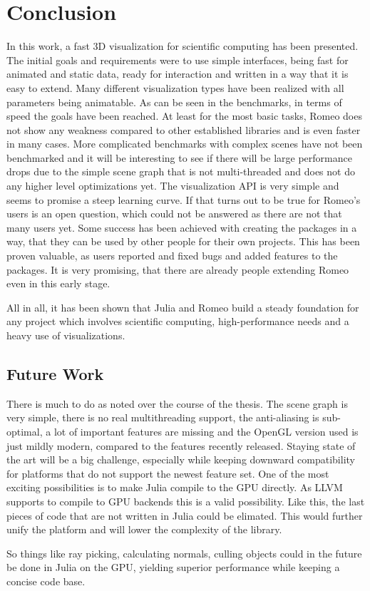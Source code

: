 \section{Conclusion}

In this work, a fast 3D visualization for scientific computing has been presented. 
The initial goals and requirements were to use simple interfaces, being fast for animated and static data, ready for interaction and written in a way that it is easy to extend.
Many different visualization types have been realized with all parameters being animatable.
As can be seen in the benchmarks, in terms of speed the goals have been reached. 
At least for the most basic tasks, Romeo does not show any weakness compared to other established libraries and is even faster in many cases.
More complicated benchmarks with complex scenes have not been benchmarked and it will be interesting to see if there will be large performance drops due to the simple scene graph that is not multi-threaded and does not do any higher level optimizations yet.
The visualization API is very simple and seems to promise a steep learning curve.
If that turns out to be true for Romeo's users is an open question, which could not be answered as there are not that many users yet.
Some success has been achieved with creating the packages in a way, that they can be used by other people for their own projects. This has been proven valuable, as users reported and fixed bugs and added features to the packages.
It is very promising, that there are already people extending Romeo even in this early stage.

All in all, it has been shown that Julia and Romeo build a steady foundation for any project which involves scientific computing, high-performance needs and a heavy use of visualizations. 

\subsection{Future Work}

There is much to do as noted over the course of the thesis. 
The scene graph is very simple, there is no real multithreading support, the anti-aliasing is sub-optimal, a lot of important features are missing and the OpenGL version used is just mildly modern, compared to the features recently released. 
Staying state of the art will be a big challenge, especially while keeping downward compatibility for platforms that do not support the newest feature set.
One of the most exciting possibilities is to make Julia compile to the GPU directly. As \ac{LLVM} supports to compile to GPU backends this is a valid possibility.
Like this, the last pieces of code that are not written in Julia could be elimated. 
This would further unify the platform and will lower the complexity of the library. 

So things like ray picking, calculating normals, culling objects could in the future be done in Julia on the GPU, yielding superior performance while keeping a concise code base.
